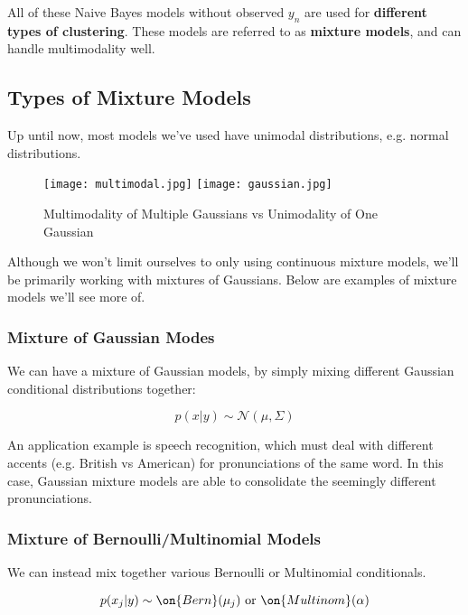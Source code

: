 \documentclass{article}
\begin{document}
All of these Naive Bayes models without observed $y_n$ are used for {\bf different types of clustering}. These models are referred to as {\bf mixture models}, and can handle  multimodality well.  

\subsection{Types of Mixture Models}
Up until now, most models we've used have unimodal distributions, e.g. normal distributions.

\begin{figure}[H]
\begin{center}
\texttt{[image: multimodal.jpg]}
\texttt{[image: gaussian.jpg]}
\caption{Multimodality of Multiple Gaussians vs Unimodality of One Gaussian}
\end{center}
\end{figure}   

Although we won't limit ourselves to only using continuous mixture models, we'll be primarily working with mixtures of Gaussians.  Below are examples of mixture models we'll see more of.

\subsubsection{Mixture of Gaussian Modes}
	We can have a mixture of Gaussian models, by simply mixing different Gaussian conditional distributions together:

	\[p(x | y) \sim \mathcal{N}(\mu, \Sigma)  \]

	An application example is speech recognition, which must deal with different accents (e.g. British vs American) for pronunciations of the same word.  In this case, Gaussian mixture models are able to consolidate the seemingly different pronunciations.


\subsubsection{Mixture of Bernoulli/Multinomial Models}

	We can instead mix together various Bernoulli or Multinomial conditionals. 

	\[ p(x_j | y) \sim \on{Bern}(\mu_j) \text{ or } \on{Multinom}(\alpha) \]


\end{document}
